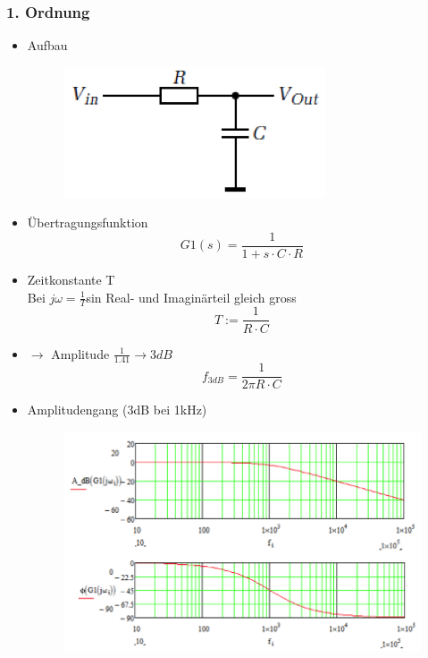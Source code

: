 \subsubsection{1. Ordnung}
\begin{itemize}
  \item Aufbau\\
  \begin{figure}[htb]
  \includegraphics[scale=0.4]{pictures/tiefpass1ordnung}
  \end{figure}
  \item Übertragungsfunktion 
  \begin{equation}
  G1(s)=\frac{1}{1+s\cdot C\cdot R}
  \end{equation}
  \item Zeitkonstante T\\
  Bei $j\omega=\frac{1}{T}$sin Real-  und Imaginärteil gleich gross
  \begin{equation}
  T:=\frac{1}{R\cdot C}
  \end{equation}
  \item $\to$ Amplitude $\frac{1}{1.41}\to 3dB$
  \begin{equation}
  f_{3dB}=\frac{1}{2\pi R\cdot C}
  \end{equation}
  \item Amplitudengang (3dB bei 1kHz)\\
  \begin{figure}[!htbs]
  \includegraphics[scale=0.5]{pictures/tiefpass1ordnungamplitude}
  \end{figure}
  
\end{itemize}
\newpage
